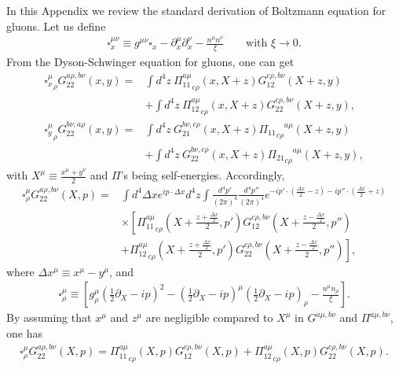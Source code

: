 \documentclass[onecolumn,showpacs,nobibnotes,nofootinbib,12pt,aps,prd,showpacs,notitlepage,nofootinbib,preprintnumbers,amsmath,amssymb]{article}
\begin{document}
In this Appendix we review the standard derivation of Boltzmann
equation for gluons.  Let us define
\begin{align}
  \square^{\mu\nu}_x\equiv
  g^{\mu\nu}\square_x-\partial_x^\mu \partial_x^\nu-\frac{n^\mu
    n^\nu}{\xi}\qquad\text{with $\xi\to 0$}.
\end{align}
From the Dyson-Schwinger equation for gluons, one can get
\begin{align}
  {\square^{\mu}_x}_\rho G^{a\rho, b\nu}_{22}(x,y)=&\int d^4 z~{\Pi_{11}^{a\mu}}_{c\rho}(x,X+z)G^{c\rho, b\nu}_{12}(X+z,y)\nonumber\\
  &+\int d^4 z~{\Pi_{12}^{a\mu}}_{c\rho}(x,X+z)G^{c\rho, b\nu}_{22}(X+z,y),\\
  {\square^{\mu}_y}_\rho G^{ b\nu,a\rho}_{22}(x,y)=&\int d^4 z~G^{ b\nu,c\rho}_{21}(x, X+z) {{\Pi_{11}}_{c\rho}}^{a\mu}(X+z,y)\nonumber\\
  &+\int d^4 z~G^{ b\nu,c\rho}_{22}(x, X+z)
  {{\Pi_{21}}_{c\rho}}^{a\mu}(X+z,y),\label{eq:Gbnuarho}
\end{align}
with $X^\mu\equiv \frac{x^\mu+y^\nu}{2}$ and $\Pi$'s being
self-energies. Accordingly,
\begin{align}
  \square^{\mu}_{\rho} G^{a\rho, b\nu}_{22}(X,p)=&\int d^4 \Delta x e^{ip\cdot \Delta x} d^4 z\int \frac{d^4 p'}{(2\pi)^4}\frac{d^4 p''}{(2\pi)^4} e^{-i p'\cdot\left(\frac{\Delta x}{2}-z\right)-i p''\cdot\left(\frac{\Delta x}{2}+z\right)}\nonumber\\
  &\times\left[{\Pi_{11}^{a\mu}}_{c\rho}\left(X+\frac{z+\frac{\Delta x}{2}}{2},p'\right)G^{c\rho, b\nu}_{12}\left(X+\frac{z-\frac{\Delta x}{2}}{2},p''\right)\right.\nonumber\\
  &\left.+{\Pi_{12}^{a\mu}}_{c\rho}\left(X+\frac{z+\frac{\Delta x}{2}}{2},p'\right)G^{c\rho,
      b\nu}_{22}\left(X+\frac{z-\frac{\Delta x}{2}}{2},p''\right)\right],
\end{align}
where $\Delta x^\mu\equiv x^\mu-y^\mu$, and
\begin{align}
  \square^{\mu}_{\rho}\equiv
  \left[g^\mu_\rho\left(\frac{1}{2}\partial_X-ip\right)^2-\left(\frac{1}{2}\partial_X-ip\right)^\mu\left(\frac{1}{2}\partial_X-ip\right)_\rho-\frac{n^\mu
      n_\rho}{ \xi}\right].
\end{align}
By assuming that $x^\mu$ and $z^\mu$ are negligible compared to
$X^\mu$ in $G^{a\mu,b\nu}$ and $\Pi^{a\mu,b\nu}$, one has
\begin{align}
  \square^{\mu}_{\rho}G^{a\rho, b\nu}_{22}(X,p)=
  {\Pi_{11}^{a\mu}}_{c\rho}\left(X,p\right)G^{c\rho,
    b\nu}_{12}\left(X,p\right)+{\Pi_{12}^{a\mu}}_{c\rho}\left(X,p\right)G^{c\rho,
    b\nu}_{22}\left(X,p\right).\label{eq:ds01}
\end{align}
\end{document}
